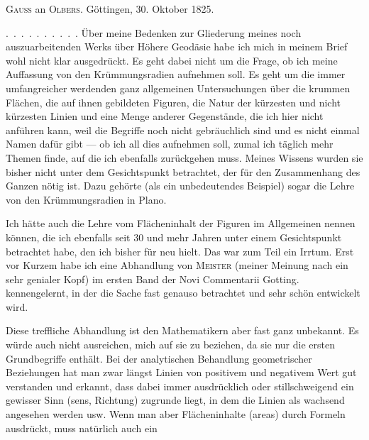\par{}
\begin{center}\textsc{Gauss} an \textsc{Olbers}. Göttingen, 30. Oktober 1825.\end{center}
\indent\mbox{. . . . . . . . . .} Über meine Bedenken zur Gliederung meines noch auszuarbeitenden Werks über Höhere Geodäsie habe ich mich in meinem Brief wohl nicht klar ausgedrückt. Es geht dabei nicht um die Frage, ob ich meine Auffassung von den Krümmungsradien aufnehmen soll. Es geht um die immer umfangreicher werdenden ganz allgemeinen Untersuchungen über die krummen Flächen, die auf ihnen gebildeten Figuren, die Natur der kürzesten und nicht kürzesten Linien und eine Menge anderer Gegenstände, die ich hier nicht anführen kann, weil die Begriffe noch nicht gebräuchlich sind und es nicht einmal Namen dafür gibt --- ob ich all dies aufnehmen soll, zumal ich täglich mehr Themen finde, auf die ich ebenfalls zurückgehen muss. Meines Wissens wurden sie bisher nicht unter dem Gesichtspunkt betrachtet, der für den Zusammenhang des Ganzen nötig ist. Dazu gehörte (als ein unbedeutendes Beispiel) sogar die Lehre von den Krümmungsradien in Plano.

Ich hätte auch die Lehre vom Flächeninhalt der Figuren im Allgemeinen nennen können, die ich ebenfalls seit 30 und mehr Jahren unter einem Gesichtspunkt betrachtet habe, den ich bisher für neu hielt. Das war zum Teil ein Irrtum. Erst vor Kurzem habe ich eine Abhandlung von \textsc{Meister} (meiner Meinung nach ein sehr genialer Kopf) im ersten Band der Novi Commentarii Gotting. kennengelernt, in der die Sache fast genauso betrachtet und sehr schön entwickelt wird.

Diese treffliche Abhandlung ist den Mathematikern aber fast ganz unbekannt. Es würde auch nicht ausreichen, mich auf sie zu beziehen, da sie nur die ersten Grundbegriffe enthält. Bei der analytischen Behandlung geometrischer Beziehungen hat man zwar längst Linien von positivem und negativem Wert gut verstanden und erkannt, dass dabei immer ausdrücklich oder stillschweigend ein gewisser Sinn (sens, Richtung) zugrunde liegt, in dem die Linien als wachsend angesehen werden usw. Wenn man aber Flächeninhalte (areas) durch Formeln ausdrückt, muss natürlich auch ein %
